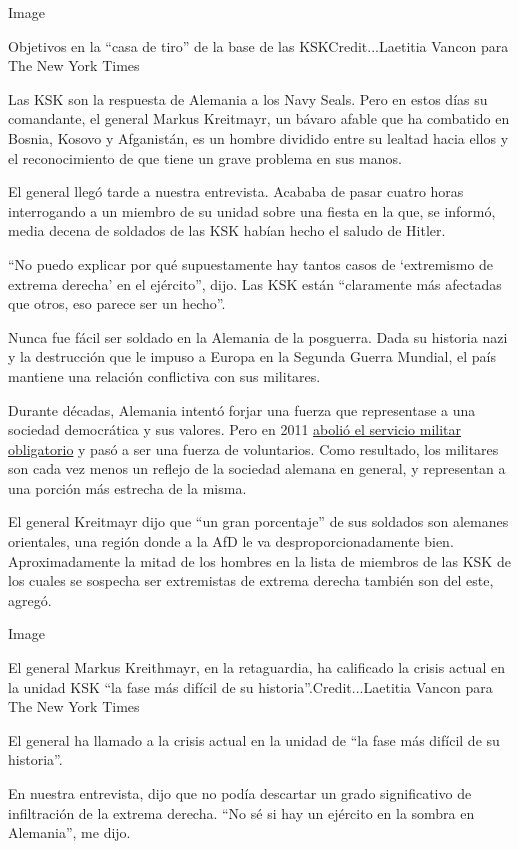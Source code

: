 Image

Objetivos en la ``casa de tiro'' de la base de las KSKCredit...Laetitia
Vancon para The New York Times

Las KSK son la respuesta de Alemania a los Navy Seals. Pero en estos
días su comandante, el general Markus Kreitmayr, un bávaro afable que ha
combatido en Bosnia, Kosovo y Afganistán, es un hombre dividido entre su
lealtad hacia ellos y el reconocimiento de que tiene un grave problema
en sus manos.

El general llegó tarde a nuestra entrevista. Acababa de pasar cuatro
horas interrogando a un miembro de su unidad sobre una fiesta en la que,
se informó, media decena de soldados de las KSK habían hecho el saludo
de Hitler.

``No puedo explicar por qué supuestamente hay tantos casos de
`extremismo de extrema derecha' en el ejército'', dijo. Las KSK están
``claramente más afectadas que otros, eso parece ser un hecho''.

Nunca fue fácil ser soldado en la Alemania de la posguerra. Dada su
historia nazi y la destrucción que le impuso a Europa en la Segunda
Guerra Mundial, el país mantiene una relación conflictiva con sus
militares.

Durante décadas, Alemania intentó forjar una fuerza que representase a
una sociedad democrática y sus valores. Pero en 2011
\href{https://www.nytimes.com/2011/07/01/world/europe/01germany.html}{abolió
el servicio militar obligatorio} y pasó a ser una fuerza de voluntarios.
Como resultado, los militares son cada vez menos un reflejo de la
sociedad alemana en general, y representan a una porción más estrecha de
la misma.

El general Kreitmayr dijo que ``un gran porcentaje'' de sus soldados son
alemanes orientales, una región donde a la AfD le va
desproporcionadamente bien. Aproximadamente la mitad de los hombres en
la lista de miembros de las KSK de los cuales se sospecha ser
extremistas de extrema derecha también son del este, agregó.

Image

El general Markus Kreithmayr, en la retaguardia, ha calificado la crisis
actual en la unidad KSK ``la fase más difícil de su
historia''.Credit...Laetitia Vancon para The New York Times

El general ha llamado a la crisis actual en la unidad de ``la fase más
difícil de su historia''.

En nuestra entrevista, dijo que no podía descartar un grado
significativo de infiltración de la extrema derecha. ``No sé si hay un
ejército en la sombra en Alemania'', me dijo.


